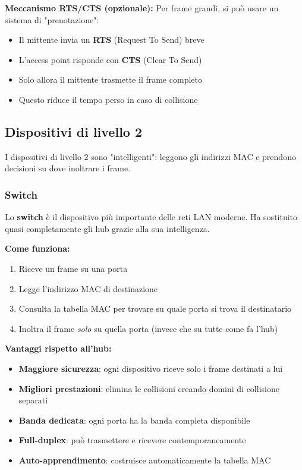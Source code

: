 \documentclass[12pt,a4paper]{article}
\begin{document}
\textbf{Meccanismo RTS/CTS (opzionale):}
Per frame grandi, si può usare un sistema di "prenotazione":
\begin{itemize}
    \item Il mittente invia un \textbf{RTS} (Request To Send) breve
    \item L'access point risponde con \textbf{CTS} (Clear To Send)
    \item Solo allora il mittente trasmette il frame completo
    \item Questo riduce il tempo perso in caso di collisione
\end{itemize}

\subsection{Dispositivi di livello 2}

I dispositivi di livello 2 sono "intelligenti": leggono gli indirizzi MAC e prendono decisioni su dove inoltrare i frame.

\subsubsection{Switch}

Lo \textbf{switch} è il dispositivo più importante delle reti LAN moderne. Ha sostituito quasi completamente gli hub grazie alla sua intelligenza.

\textbf{Come funziona:}
\begin{enumerate}
    \item Riceve un frame su una porta
    \item Legge l'indirizzo MAC di destinazione
    \item Consulta la tabella MAC per trovare su quale porta si trova il destinatario
    \item Inoltra il frame \textit{solo} su quella porta (invece che su tutte come fa l'hub)
\end{enumerate}

\textbf{Vantaggi rispetto all'hub:}
\begin{itemize}
    \item \textbf{Maggiore sicurezza}: ogni dispositivo riceve solo i frame destinati a lui
    \item \textbf{Migliori prestazioni}: elimina le collisioni creando domini di collisione separati
    \item \textbf{Banda dedicata}: ogni porta ha la banda completa disponibile
    \item \textbf{Full-duplex}: può trasmettere e ricevere contemporaneamente
    \item \textbf{Auto-apprendimento}: costruisce automaticamente la tabella MAC
\end{itemize}
\end{document}
